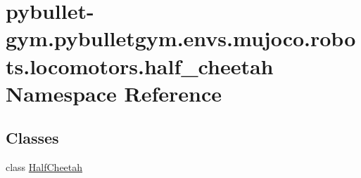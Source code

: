 \hypertarget{namespacepybullet-gym_1_1pybulletgym_1_1envs_1_1mujoco_1_1robots_1_1locomotors_1_1half__cheetah}{}\section{pybullet-\/gym.pybulletgym.\+envs.\+mujoco.\+robots.\+locomotors.\+half\+\_\+cheetah Namespace Reference}
\label{namespacepybullet-gym_1_1pybulletgym_1_1envs_1_1mujoco_1_1robots_1_1locomotors_1_1half__cheetah}
\subsection*{Classes}
\begin{DoxyCompactItemize}
\item 
class \hyperlink{classpybullet-gym_1_1pybulletgym_1_1envs_1_1mujoco_1_1robots_1_1locomotors_1_1half__cheetah_1_1_half_cheetah}{Half\+Cheetah}
\end{DoxyCompactItemize}
